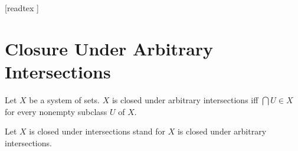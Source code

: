 \documentclass[10pt]{article}
\begin{document}
  \begin{imports}
    \begin{forthel}
      [readtex ]
    \end{forthel}
  \end{imports}


  \section*{Closure Under Arbitrary Intersections}

  \begin{forthel}
    \begin{definition}
      Let $X$ be a system of sets.
      $X$ is closed under arbitrary intersections iff $\bigcap U \in X$ for every nonempty subclass $U$ of $X$.
    \end{definition}

    Let $X$ is closed under intersections stand for $X$ is closed under arbitrary intersections.
  \end{forthel}
\end{document}
